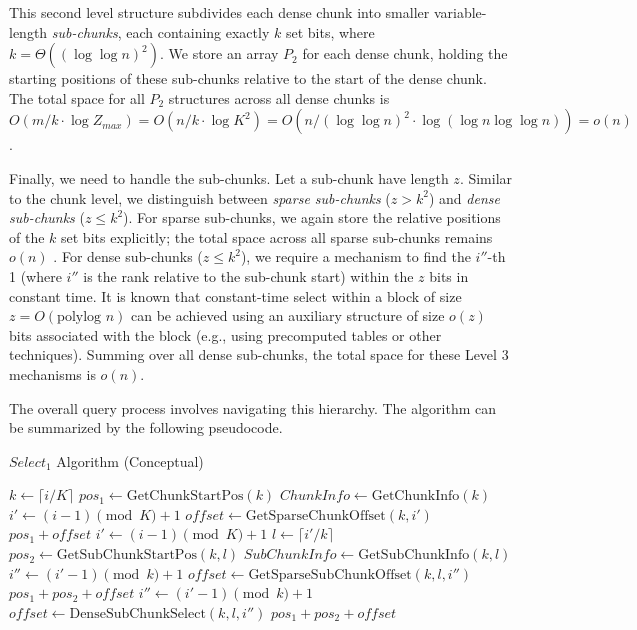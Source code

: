 This second level structure subdivides each dense chunk into smaller variable-length \emph{sub-chunks}, each containing exactly $k$ set bits, where $k = \Theta((\log \log n)^2)$. We store an array $P_2$ for each dense chunk, holding the starting positions of these sub-chunks relative to the start of the dense chunk. The total space for all $P_2$ structures across all dense chunks is $O(m/k \cdot \log Z_{max}) = O(n/k \cdot \log K^2) = O(n / (\log \log n)^2 \cdot \log(\log n \log \log n)) = o(n)$.

Finally, we need to handle the sub-chunks. Let a sub-chunk have length $z$. Similar to the chunk level, we distinguish between \emph{sparse sub-chunks} ($z > k^2$) and \emph{dense sub-chunks} ($z \le k^2$). For sparse sub-chunks, we again store the relative positions of the $k$ set bits explicitly; the total space across all sparse sub-chunks remains $o(n)$ \cite{clark1997compact}. For dense sub-chunks ($z \le k^2$), we require a mechanism to find the $i''$-th 1 (where $i''$ is the rank relative to the sub-chunk start) within the $z$ bits in constant time. It is known \cite{clark1997compact} that constant-time \textsf{select} within a block of size $z=O(\text{polylog } n)$ can be achieved using an auxiliary structure of size $o(z)$ bits associated with the block (e.g., using precomputed tables or other techniques). Summing over all dense sub-chunks, the total space for these Level 3 mechanisms is $o(n)$.

The overall query process involves navigating this hierarchy. The algorithm can be summarized by the following pseudocode.

\begin{algorithm}[hbtp]
    \caption{$Select_1$ Algorithm (Conceptual)} \label{alg:select}
    \begin{algorithmic}[1] \small
        \State $k \gets \lceil i/K \rceil$
        \State $pos_1 \gets \text{GetChunkStartPos}(k)$
        \State $ChunkInfo \gets \text{GetChunkInfo}(k)$
        \State $i' \gets (i-1) \pmod K + 1$
        \State $offset \gets \text{GetSparseChunkOffset}(k, i')$
        \State \Return $pos_1 + offset$
        \Else
        \State $i' \gets (i-1) \pmod K + 1$
        \State $l \gets \lceil i'/k \rceil$
        \State $pos_2 \gets \text{GetSubChunkStartPos}(k, l)$
        \State $SubChunkInfo \gets \text{GetSubChunkInfo}(k, l)$
        \State $i'' \gets (i'-1) \pmod k + 1$
        \State $offset \gets \text{GetSparseSubChunkOffset}(k, l, i'')$
        \State \Return $pos_1 + pos_2 + offset$
        \Else
        \State $i'' \gets (i'-1) \pmod k + 1$
        \State $offset \gets \text{DenseSubChunkSelect}(k, l, i'')$
        \State \Return $pos_1 + pos_2 + offset$
        \EndIf
        \EndIf
        \EndFunction
    \end{algorithmic}
\end{algorithm}


